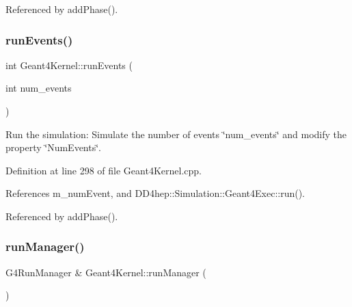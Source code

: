 Referenced by add\+Phase().

\hypertarget{class_d_d4hep_1_1_simulation_1_1_geant4_kernel_a0ce3dec62c67dbaf72748238983bb898}{}\label{class_d_d4hep_1_1_simulation_1_1_geant4_kernel_a0ce3dec62c67dbaf72748238983bb898} 
\subsubsection{\texorpdfstring{run\+Events()}{runEvents()}}
{\footnotesize\ttfamily int Geant4\+Kernel\+::run\+Events (\begin{DoxyParamCaption}\item[{int}]{num\+\_\+events }\end{DoxyParamCaption})\hspace{0.3cm}{\ttfamily [virtual]}}



Run the simulation\+: Simulate the number of events \char`\"{}num\+\_\+events\char`\"{} and modify the property \char`\"{}\+Num\+Events\char`\"{}. 



Definition at line 298 of file Geant4\+Kernel.\+cpp.



References m\+\_\+num\+Event, and D\+D4hep\+::\+Simulation\+::\+Geant4\+Exec\+::run().



Referenced by add\+Phase().

\hypertarget{class_d_d4hep_1_1_simulation_1_1_geant4_kernel_aa01093467efb9b3a4f9179ba22ac7899}{}\label{class_d_d4hep_1_1_simulation_1_1_geant4_kernel_aa01093467efb9b3a4f9179ba22ac7899} 
\subsubsection{\texorpdfstring{run\+Manager()}{runManager()}}
{\footnotesize\ttfamily G4\+Run\+Manager \& Geant4\+Kernel\+::run\+Manager (\begin{DoxyParamCaption}{ }\end{DoxyParamCaption})}



